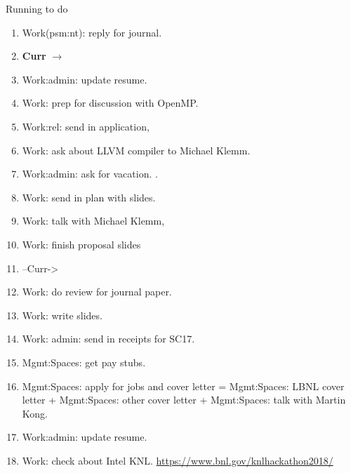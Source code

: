 
\begin{frame}{Running to do}
\begin{enumerate}
\item \tiny Work(psm:nt): reply for journal. 
  \tiny \item[] \tiny \textbf{Curr} $\rightarrow$ 
\item \tiny Work:admin: update resume. 
  
\item \tiny Work: prep for discussion with OpenMP. 
\item \tiny Work:rel: send in application,
\item \tiny Work: ask about LLVM compiler to Michael Klemm. 
\item \tiny Work:admin: ask for vacation.  . 
\item \tiny Work: send in plan with slides.
\item \tiny Work: talk with Michael Klemm, 

\item \tiny Work: finish proposal slides   
\item \tiny  –Curr-> 

  \tiny \item \tiny Work: do review for journal paper. 
\item \tiny Work: write slides. 



\item \tiny Work: admin: send in receipts for SC17. 
\item \tiny Mgmt:Spaces: get pay stubs. 
\item \tiny Mgmt:Spaces: apply for jobs and cover letter = Mgmt:Spaces: LBNL cover letter + Mgmt:Spaces: other cover letter + Mgmt:Spaces: talk with Martin Kong. 
\item \tiny Work:admin: update resume.
\item \tiny Work: check about Intel KNL.  \url{https://www.bnl.gov/knlhackathon2018/} 
  

\end{enumerate}
\end{frame}

